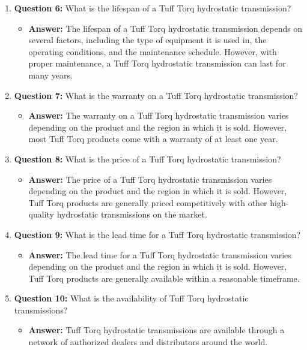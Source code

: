 \documentclass{article}
\begin{document}
\begin{enumerate}
    \item \textbf{Question 6:} What is the lifespan of a Tuff Torq hydrostatic transmission?
    \begin{itemize}
        \item \textbf{Answer:} The lifespan of a Tuff Torq hydrostatic transmission depends on several factors, including the type of equipment it is used in, the operating conditions, and the maintenance schedule. However, with proper maintenance, a Tuff Torq hydrostatic transmission can last for many years.
    \end{itemize}
    
    \item \textbf{Question 7:} What is the warranty on a Tuff Torq hydrostatic transmission?
    \begin{itemize}
        \item \textbf{Answer:} The warranty on a Tuff Torq hydrostatic transmission varies depending on the product and the region in which it is sold. However, most Tuff Torq products come with a warranty of at least one year.
    \end{itemize}
    
    \item \textbf{Question 8:} What is the price of a Tuff Torq hydrostatic transmission?
    \begin{itemize}
        \item \textbf{Answer:} The price of a Tuff Torq hydrostatic transmission varies depending on the product and the region in which it is sold. However, Tuff Torq products are generally priced competitively with other high-quality hydrostatic transmissions on the market.
    \end{itemize}
    
    \item \textbf{Question 9:} What is the lead time for a Tuff Torq hydrostatic transmission?
    \begin{itemize}
        \item \textbf{Answer:} The lead time for a Tuff Torq hydrostatic transmission varies depending on the product and the region in which it is sold. However, Tuff Torq products are generally available within a reasonable timeframe.
    \end{itemize}
    
    \item \textbf{Question 10:} What is the availability of Tuff Torq hydrostatic transmissions?
    \begin{itemize}
        \item \textbf{Answer:} Tuff Torq hydrostatic transmissions are available through a network of authorized dealers and distributors around the world.
    \end{itemize}
    

\end{enumerate}
\end{document}
